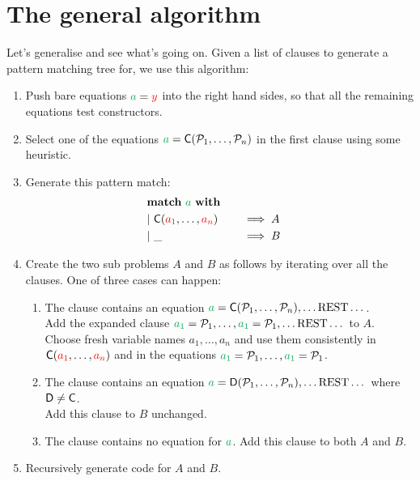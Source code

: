 \documentclass[a4paper, 11pt]{article}
\theoremstyle{definition}
\begin{document}
\section{The general algorithm}

Let's generalise and see what's going on. Given a list of clauses to generate a pattern matching tree for, we use this algorithm:

\begin{enumerate}
  \item Push bare equations $\ba = \fvar y$ into the right hand sides, so that all the remaining equations test constructors.
  \item Select one of the equations $\ba = \C(\pat_1, \dots, \pat_n)$ in the first clause using some heuristic.
  \item Generate this pattern match:
  \begin{alignat*}{4}
    \matchwith{\ba} \\
    \clause{\C(\fvar{a_1}, \dots, \fvar{a_n})}{A} \\
    \clause{\_}{B}
  \end{alignat*}
  \item Create the two sub problems $A$ and $B$ as follows by iterating over all the clauses. One of three cases can happen:
  \begin{enumerate}
    \item The clause contains an equation $\ba = \C(\pat_1, \dots, \pat_n), \dots \text{REST} \dots$. \\
          Add the expanded clause $\bvar{a_1} = \pat_1, \dots, \bvar{a_1} = \pat_1, \dots \text{REST} \dots$ to $A$. \\
          Choose fresh variable names $a_1,\dots,a_n$ and use them consistently in $\mathsf{\textcolor{black}{C}}(\textcolor{red}{a_1}, \dots, \textcolor{red}{a_n})$ and in the equations $\bvar{a_1} = \pat_1, \dots, \bvar{a_1} = \pat_1$.
    \item The clause contains an equation $\ba = \mathsf{D}(\pat_1, \dots, \pat_n), \dots \text{REST} \dots$ where $\mathsf{D} \neq \mathsf{\textcolor{black}{C}}$. \\
          Add this clause to $B$ unchanged.
    \item The clause contains no equation for $\ba$. Add this clause to both $A$ and $B$.
  \end{enumerate}
  \item Recursively generate code for $A$ and $B$.
\end{enumerate}

\medskip
\end{document}
